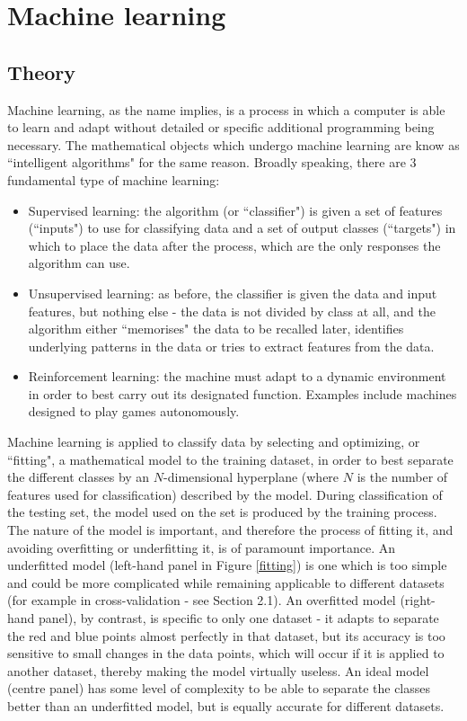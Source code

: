 \documentclass[12pt]{article}
\begin{document}
\section{Machine learning}
\subsection{Theory}

Machine learning, as the name implies, is a process in which a computer is able to learn and adapt without detailed or specific additional programming being necessary. The mathematical objects which undergo machine learning are know as ``intelligent algorithms" for the same reason. Broadly speaking, there are 3 fundamental type of machine learning:

\begin{itemize}
\item Supervised learning: the algorithm (or ``classifier") is given a set of features (``inputs") to use for classifying data and a set of output classes (``targets") in which to place the data after the process, which are the only responses the algorithm can use.

\item Unsupervised learning: as before, the classifier is given the data and input features, but nothing else - the data is not divided by class at all, and the algorithm either ``memorises" the data to be recalled later, identifies underlying patterns in the data or tries to extract features from the data.

\item Reinforcement learning: the machine must adapt to a dynamic environment in order to best carry out its designated function. Examples include machines designed to play games autonomously.
\end{itemize}

Machine learning is applied to classify data by selecting and optimizing, or ``fitting", a mathematical model to the training dataset, in order to best separate the different classes by an $N$-dimensional hyperplane (where $N$ is the number of features used for classification) described by the model. During classification of the testing set, the model used on the set is produced by the training process. The nature of the model is important, and therefore the process of fitting it, and avoiding overfitting or underfitting it, is of paramount importance. An underfitted model (left-hand panel in Figure \ref{fitting}) is one which is too simple and could be more complicated while remaining applicable to different datasets (for example in cross-validation - see Section 2.1). An overfitted model (right-hand panel), by contrast, is specific to only one dataset - it adapts to separate the red and blue points almost perfectly in that dataset, but its accuracy is too sensitive to small changes in the data points, which will occur if it is applied to another dataset, thereby making the model virtually useless. An ideal model (centre panel) has some level of complexity to be able to separate the classes better than an underfitted model, but is equally accurate for different datasets.
\end{document}
